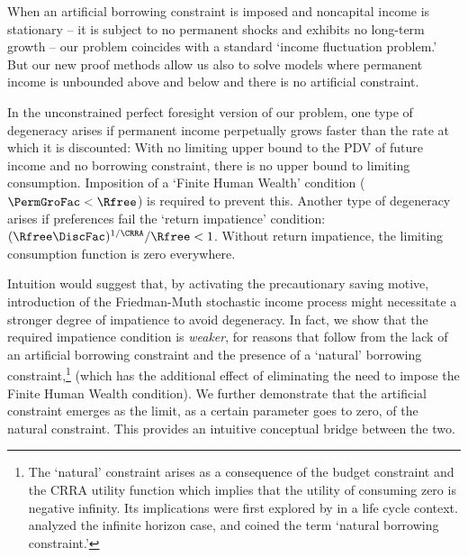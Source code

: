 \documentclass[BufferStockTheory]{subfiles}
\begin{document}

\newcommand{\APFacRaw}{(\Rfree\DiscFac)^{1/\CRRA}}
When an artificial borrowing constraint is imposed and noncapital income is stationary -- it is subject to no permanent shocks and exhibits no long-term growth %
-- our problem coincides with a standard `income fluctuation problem.' But our new proof methods allow us also to solve models where permanent income is unbounded above and below and there is no artificial constraint.


In the unconstrained perfect foresight version of our problem, one type of degeneracy arises if permanent income perpetually grows faster than the rate at which it is discounted: With no limiting upper bound to the PDV of future income and no borrowing constraint, there is no upper bound to limiting consumption. Imposition of a `Finite Human Wealth' condition ($\PermGroFac < \Rfree$) is required to prevent this. Another type of degeneracy arises if preferences fail the `return impatience' condition: $\APFacRaw/\Rfree < 1$.  Without return impatience, the limiting consumption function is zero everywhere.

Intuition would suggest that, by activating the precautionary saving motive, introduction of the Friedman-Muth stochastic income process might necessitate a stronger degree of impatience to avoid degeneracy. In fact, we show that the required impatience condition is \textit{weaker}, for reasons that follow from the lack of an artificial borrowing constraint and the presence of a `natural' borrowing constraint,\footnote{The `natural' constraint arises as a consequence of the budget constraint and the CRRA utility function which implies that the utility of consuming zero is negative infinity.  Its implications were first explored by \cite{zeldesStochastic} in a life cycle context. \cite{carroll:brookings} analyzed the infinite horizon case, and \cite{aiyagari:ge} coined the term `natural borrowing constraint.'} (which has the additional effect of eliminating the need to impose the Finite Human Wealth condition). We further demonstrate that the artificial constraint emerges as the limit, as a certain parameter goes to zero, of the natural constraint. This provides an intuitive conceptual bridge between the two.
\end{document}
